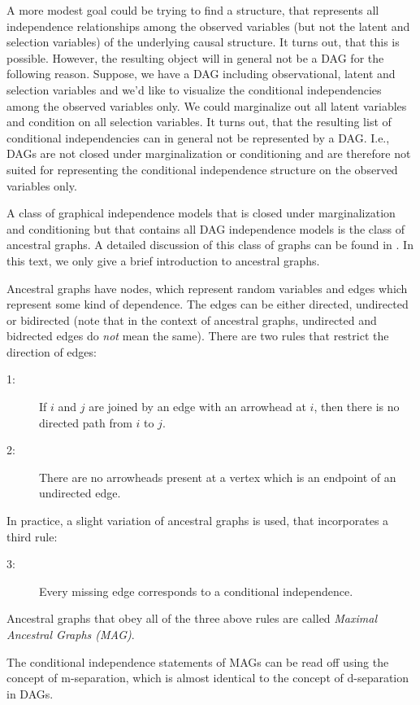 \documentclass[article]{jss}
\begin{document}
A more modest goal could be trying to find a structure, that represents all
independence relationships among the observed variables (but not the latent
and selection variables) of the underlying causal structure. It turns out,
that this is possible. However, the resulting object will in general not be
a DAG for the following reason. Suppose, we have a DAG including
observational, latent and selection variables and we'd like to visualize
the conditional independencies among the observed variables only. We could
marginalize out all latent variables and condition on all selection
variables. It turns out, that the resulting list of conditional
independencies can in general not be represented by a DAG. I.e., DAGs are
not closed under marginalization or conditioning and are therefore not
suited for representing the conditional independence structure on the
observed variables only.

A class of graphical independence models that is closed under
marginalization and conditioning but that contains all DAG independence
models is the class of ancestral graphs. A detailed discussion of this
class of graphs can be found in \cite{RichardsonSpirtes02}. In this text,
we only give a brief introduction to ancestral graphs.

Ancestral graphs have nodes, which represent random variables and edges
which represent some kind of dependence. The edges can be either directed,
undirected or bidirected (note that in the context of ancestral graphs,
undirected and bidrected edges do \emph{not} mean the same). There are two
rules that restrict the direction of edges:
\begin{description}
  \item[1:] If $i$ and $j$ are joined by an edge with an arrowhead at $i$, then
    there is no directed path from $i$ to $j$.
  \item[2:] There are no arrowheads present at a vertex which is an
    endpoint of an undirected edge.
\end{description}
In practice, a slight variation of ancestral graphs is used, that
incorporates a third rule:
\begin{description}
\item[3:] Every missing edge corresponds to a conditional independence.
\end{description}
Ancestral graphs that obey all of the three above rules are called
\emph{Maximal Ancestral Graphs (MAG)}. 

The conditional independence statements of MAGs can be read off using the concept
of m-separation, which is almost identical to the concept of d-separation
in DAGs.
\end{document}
